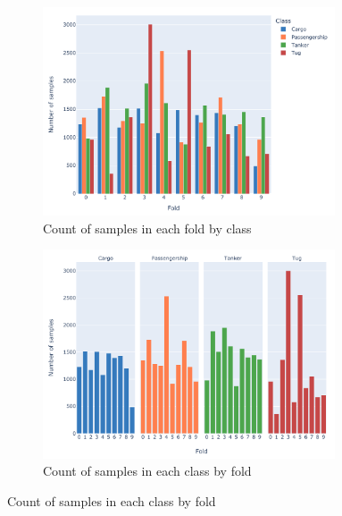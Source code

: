 \begin{figure}[htbp]
    \centering
    \begin{subfigure}[t]{\textwidth}
        \centering
        \includegraphics[width=0.95\textwidth]{img/ch3/10_folds_counts.pdf}
        \caption{Count of samples in each fold by class}
        \label{fig:10-fold-counts}
    \end{subfigure}
    
    \begin{subfigure}[t]{\textwidth}
        \centering
        \includegraphics[width=0.95\textwidth]{img/ch3/10_fold_counts_facet.pdf}
        \caption{Count of samples in each class by fold}
        \label{fig:10-fold-counts-facet}
    \end{subfigure}
    \vfill
\end{figure}
